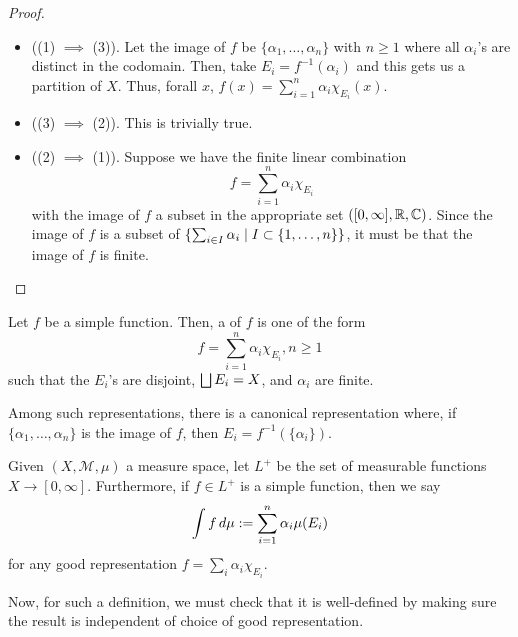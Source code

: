 \documentclass[11pt,leqno,oneside]{amsbook}
\numberwithin{thm}{section}
\newcommand{\M}{\mathcal{M}}
\begin{document}
 \begin{proof}
   \begin{itemize}
   \item ((1) $\implies$ (3)). Let the image of $f$ be $\{\alpha_1,
     \ldots, \alpha_n\}$ with $n \geq 1$ where all $\alpha_i$'s are
     distinct in the codomain. Then, take $E_i = f^{-1}(\alpha_i)$ and
     this gets us a partition of $X$. Thus, forall $x$, $f(x) =
     \sum_{i=1}^n \alpha_i \chi_{E_i}(x)$.
   \item ((3) $\implies$ (2)). This is trivially true.
   \item ((2) $\implies$ (1)). Suppose we have the finite linear
     combination \[
       f = \sum_{i=1}^n \alpha_i \chi_{E_i}
     \]
     with the image of $f$ a subset in the appropriate set
     $([0,\infty],{\mathbb R},{\mathbb C})$. Since the image of $f$ is a subset of
     $\{\sum_{i \in I} \alpha_i \mid I \subset \{1,\ldots,n\}\}$, it
     must be that the image of $f$ is finite.
   \end{itemize}
 \end{proof}
 \begin{defn}
   Let $f$ be a simple function. Then, a  of
   $f$ is one of the form \[
     f = \sum_{i=1}^n \alpha_i \chi_{E_i}, n \geq 1
   \]
   such that the $E_i$'s are disjoint, $\bigsqcup E_i = X$, and
   $\alpha_i$ are finite.
 \end{defn}
Among such representations, there is a canonical representation where,
if $\{\alpha_1, \ldots, \alpha_n\}$ is the image of $f$, then $E_i =
f^{-1}(\{\alpha_i\})$.
\begin{defn}
  Given $(X, \M, \mu)$ a measure space, let $L^+$ be the set of
  measurable functions $X \to [0,\infty]$. Furthermore, if $f \in L^+$
  is a simple function, then we say \[
    \int f \, d\mu := \sum_{i=1}^n \alpha_i \mu(E_i)
  \]
  for any good representation $f = \sum_i \alpha_i \chi_{E_i}$.
\end{defn}
Now, for such a definition, we must check that it is well-defined by
making sure the result is independent of choice of good
representation.
\end{document}
